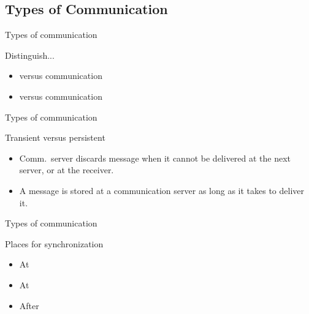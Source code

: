 \subsection{Types of Communication}
\begin{slide}{Types of communication}
  \begin{block}{Distinguish...}
    \begin{center}
    \end{center}
    \begin{itemize}\tightlist
    \item {} versus  communication
    \item {} versus  communication
    \end{itemize}
  \end{block}
\end{slide}
\begin{slide}{Types of communication}
  \begin{block}{Transient versus persistent}
    \begin{center}
    \end{center}
    \begin{itemize}\tightlist
    \item {} Comm.\ server discards message when it cannot be delivered at the
      next server, or at the receiver.
    \item {} A message is stored at a communication server as long as it takes to
      deliver it.
    \end{itemize}
  \end{block}
\end{slide}
\begin{slide}{Types of communication}
  \begin{block}{Places for synchronization}
    \begin{center}
    \end{center}
    \begin{itemize}\tightlist
    \item At 
    \item At 
    \item After 
    \end{itemize}
  \end{block}
\end{slide}
